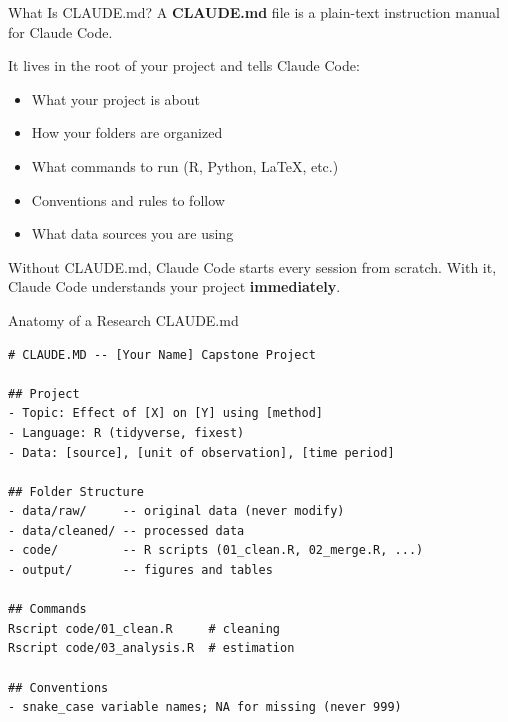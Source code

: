 \begin{frame}{What Is CLAUDE.md?}
  A \textbf{CLAUDE.md} file is a plain-text instruction manual for Claude Code.

  \vspace{8pt}

  It lives in the root of your project and tells Claude Code:

  \begin{itemize}
    \item What your project is about
    \item How your folders are organized
    \item What commands to run (R, Python, LaTeX, etc.)
    \item Conventions and rules to follow
    \item What data sources you are using
  \end{itemize}

  \vspace{8pt}

  Without CLAUDE.md, Claude Code starts every session from scratch. With it, Claude Code understands your project \textbf{immediately}.
\end{frame}

\begin{frame}[fragile]{Anatomy of a Research CLAUDE.md}
\begin{lstlisting}[style=terminal, basicstyle=\ttfamily\scriptsize\color{darkgray}]
# CLAUDE.MD -- [Your Name] Capstone Project

## Project
- Topic: Effect of [X] on [Y] using [method]
- Language: R (tidyverse, fixest)
- Data: [source], [unit of observation], [time period]

## Folder Structure
- data/raw/     -- original data (never modify)
- data/cleaned/ -- processed data
- code/         -- R scripts (01_clean.R, 02_merge.R, ...)
- output/       -- figures and tables

## Commands
Rscript code/01_clean.R     # cleaning
Rscript code/03_analysis.R  # estimation

## Conventions
- snake_case variable names; NA for missing (never 999)
\end{lstlisting}
\end{frame}


